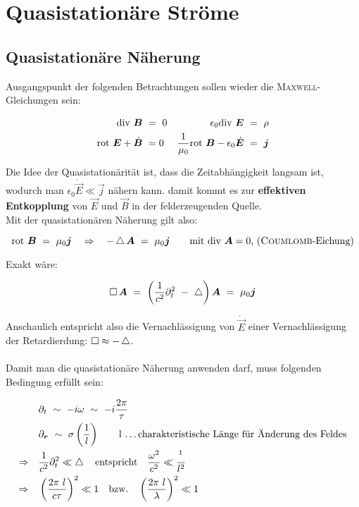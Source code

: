 \chapter{Quasistationäre Ströme}

\section{Quasistationäre Näherung}

Ausgangspunkt der folgenden Betrachtungen sollen wieder die \textsc{Maxwell}-Gleichungen sein:

\begin{align*}
\div \vec{B} \ &= \ 0  &\epsilon_0\div\vec{E}  \ &= \ \rho\\
\rot\vec{E}+\dot{\vec{B}}  \ &= 0  &\frac{1}{\mu_0}\rot\vec{B}-\epsilon_0\dot{\vec{E}}  \ &= \ \vec{j}  
\end{align*}

Die Idee der Quasistationärität ist, dass die Zeitabhängigkeit langsam ist, wodurch man $\epsilon_0\dot{\vec{E}}\ll\vec{j}$ nähern kann. damit kommt es zur \textbf{effektiven Entkopplung} von $\vec{E}$ und $\vec{B}$ in der felderzeugenden Quelle.\\
Mit der quasistationären Näherung gilt also:

\begin{equation*}
\text{rot }\bm{B} \ = \ \mu_0\bm{j} \quad\Rightarrow\quad -\mathop{{}\bigtriangleup}\nolimits\bm{A}  \ = \ \mu_0\bm{j} \qquad \text{mit $\text{div } \bm{A}=0$, (\textsc{Coumlomb}-Eichung)}
\end{equation*}

Exakt wäre:

\begin{equation*}
\mathop{{}\Box}\nolimits\bm{A}  \ = \  \left(\frac{1}{c^2}\partial^2_t \ - \ \mathop{{}\bigtriangleup}\nolimits\right)\bm{A}  \ = \  \mu_0\bm{j}
\end{equation*}


Anschaulich entspricht also die Vernachlässigung von $\dot{\vec{E}}$ einer Vernachlässigung der Retardierdung: $\mathop{{}\Box}\nolimits \approx - \mathop{{}\bigtriangleup}\nolimits$.\\
\ \\
Damit man die quasistationäre Näherung anwenden darf, muss folgenden Bedingung erfüllt sein:

\begin{align*}
& \partial_t \ \sim \ -i\omega \ \sim \ -i\frac{2\pi}{\tau}\\
& \partial_{\bm{r}} \ \sim \ \sigma\left(\frac{1}{l}\right) \qquad \text{l \ldots charakteristische Länge für Änderung des Feldes}\\
\Rightarrow \quad & \frac{1}{c^2}\partial_t^2\ll\mathop{{}\bigtriangleup}\nolimits \quad \text{entspricht} \quad \frac{\omega^2}{c^2}\ll\frac{^1}{l^2}\\
\Rightarrow \quad &\left(\frac{2\pi \ l}{c\tau}\right)^2\ll 1 \quad\text{bzw.}\quad\left(\frac{2\pi \ l}{\lambda}\right)^2\ll 1
\end{align*}


